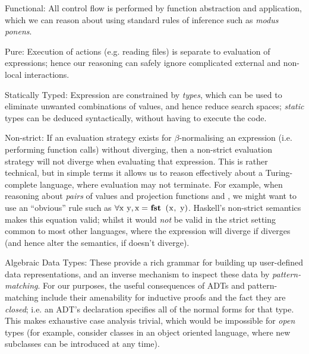 \begin{description}

\item{Functional}: All control flow is performed by function abstraction and application, which we can reason about using standard rules of inference such as \emph{modus ponens}.

\item{Pure}: Execution of actions (e.g. reading files) is separate to evaluation of expressions; hence our reasoning can safely ignore complicated external and non-local interactions.

\item{Statically Typed}: Expression are constrained by \emph{types}, which can be used to eliminate unwanted combinations of values, and hence reduce search spaces; \emph{static} types can be deduced syntactically, without having to execute the code.

\item{Non-strict}: If an evaluation strategy exists for $\beta$-normalising an expression (i.e. performing function calls) without diverging, then a non-strict evaluation strategy will not diverge when evaluating that expression. This is rather technical, but in simple terms it allows us to reason effectively about a Turing-complete language, where evaluation may not terminate. For example, when reasoning about \emph{pairs} of values  and projection functions  and , we might want to use an ``obvious'' rule such as $\forall \text{\hs{x y}}, \text{\hs{x}} = \text{\hs{fst (x, y)}}$. Haskell's non-strict semantics makes this equation valid; whilst it would \emph{not} be valid in the strict setting common to most other languages, where the expression  will diverge if  diverges (and hence alter the semantics, if  doesn't diverge).

\item{Algebraic Data Types}: These provide a rich grammar for building up user-defined data representations, and an inverse mechanism to inspect these data by \emph{pattern-matching}. For our purposes, the useful consequences of ADTs and pattern-matching include their amenability for inductive proofs and the fact they are \emph{closed}; i.e. an ADT's declaration specifies all of the normal forms for that type. This makes exhaustive case analysis trivial, which would be impossible for \emph{open} types (for example, consider classes in an object oriented language, where new subclasses can be introduced at any time).


\end{description}
